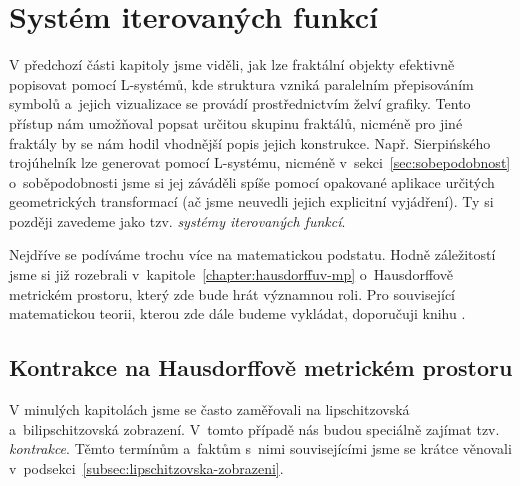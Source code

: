 \section{Systém iterovaných funkcí}\label{sec:ifs}

V předchozí části kapitoly jsme viděli, jak lze fraktální objekty efektivně popisovat pomocí L-systémů, kde struktura vzniká paralelním přepisováním symbolů a~jejich vizualizace se provádí prostřednictvím želví grafiky. Tento přístup nám umožňoval popsat určitou skupinu fraktálů, nicméně pro jiné fraktály by se nám hodil vhodnější popis jejich konstrukce. Např. Sierpińského trojúhelník lze generovat pomocí L-systému, nicméně v~sekci~\ref{sec:sobepodobnost} o~soběpodobnosti jsme si jej záváděli spíše pomocí opakované aplikace určitých geometrických transformací (ač jsme neuvedli jejich explicitní vyjádření). Ty si později zavedeme jako tzv. \emph{systémy iterovaných funkcí}.

Nejdříve se podíváme trochu více na matematickou podstatu. Hodně záležitostí jsme si již rozebrali v~kapitole~\ref{chapter:hausdorffuv-mp} o~Hausdorffově metrickém prostoru, který zde bude hrát významnou roli. Pro související matematickou teorii, kterou zde dále budeme vykládat, doporučuji knihu \cite{Barnsley1993}.

\subsection{Kontrakce na Hausdorffově metrickém prostoru}\label{subsec:hausdorffuv-mp-kontrakce}

V minulých kapitolách jsme se často zaměřovali na lipschitzovská a~bilipschitzovská zobrazení. V~tomto případě nás budou speciálně zajímat tzv. \emph{kontrakce}. Těmto termínům a~faktům s~nimi souvisejícími jsme se krátce věnovali v~podsekci~\ref{subsec:lipschitzovska-zobrazeni}.


